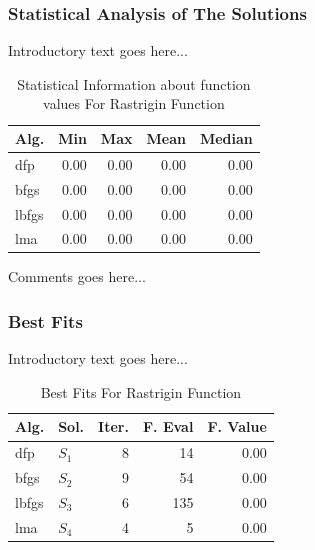 \documentclass{ieeeaccess}
\begin{document}
\subsubsection{Statistical Analysis of The Solutions}
\label{statisticalanalysisrastrigin30d30D}


Introductory text goes here...
\begin{table}
\centering
\caption{Statistical Information about function values For Rastrigin Function}
\label{function_values:rastrigin30d}
\begin{tabular}{lrrrr}
\toprule
 Alg. &  Min &  Max &  Mean &  Median \\
\midrule
  dfp & 0.00 & 0.00 &  0.00 &    0.00 \\
 bfgs & 0.00 & 0.00 &  0.00 &    0.00 \\
lbfgs & 0.00 & 0.00 &  0.00 &    0.00 \\
  lma & 0.00 & 0.00 &  0.00 &    0.00 \\
\bottomrule
\end{tabular}
\end{table}


Comments goes here...
\subsubsection{Best Fits}
\label{bestfitsrastrigin30d30D}


Introductory text goes here...
\begin{table}
\centering
\caption{Best Fits For Rastrigin Function}
\label{solutions:rastrigin30d}
\begin{tabular}{llrrr}
\toprule
 Alg. &    Sol. &  Iter. &  F. Eval &  F. Value \\
\midrule
  dfp & $S_{1}$ &      8 &       14 &      0.00 \\
 bfgs & $S_{2}$ &      9 &       54 &      0.00 \\
lbfgs & $S_{3}$ &      6 &      135 &      0.00 \\
  lma & $S_{4}$ &      4 &        5 &      0.00 \\
\bottomrule
\end{tabular}
\end{table}
\end{document}
